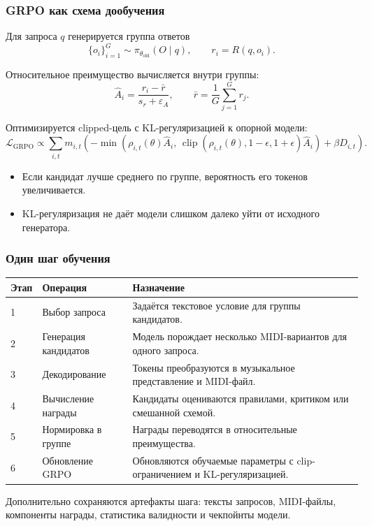 \documentclass[aspectratio=169]{beamer}
\begin{document}
\begin{frame}
\frametitle{GRPO как схема дообучения}
\small
Для запроса $q$ генерируется группа ответов
\[
\{o_i\}_{i=1}^G \sim \pi_{\theta_{\mathrm{old}}}(O \mid q),
\qquad
r_i = R(q, o_i).
\]

Относительное преимущество вычисляется внутри группы:
\[
\hat{A}_i = \frac{r_i - \bar{r}}{s_r + \varepsilon_A},
\qquad
\bar{r} = \frac{1}{G}\sum_{j=1}^G r_j.
\]

Оптимизируется clipped-цель с KL-регуляризацией к опорной модели:
\[
\mathcal{L}_{\mathrm{GRPO}} \propto
\sum_{i,t} m_{i,t}
\left(
-\min(\rho_{i,t}(\theta)\hat{A}_i,\,
\operatorname{clip}(\rho_{i,t}(\theta),1-\epsilon,1+\epsilon)\hat{A}_i)
+ \beta D_{i,t}
\right).
\]

\begin{itemize}
    \item Если кандидат лучше среднего по группе, вероятность его токенов увеличивается.
    \item KL-регуляризация не даёт модели слишком далеко уйти от исходного генератора.
\end{itemize}
\end{frame}

\begin{frame}
\frametitle{Один шаг обучения}
\small
\begin{tabular}{p{} p{} p{}}
\toprule
\textbf{Этап} & \textbf{Операция} & \textbf{Назначение} \\
\midrule
1 & Выбор запроса & Задаётся текстовое условие для группы кандидатов. \\
2 & Генерация кандидатов & Модель порождает несколько MIDI-вариантов для одного запроса. \\
3 & Декодирование & Токены преобразуются в музыкальное представление и MIDI-файл. \\
4 & Вычисление награды & Кандидаты оцениваются правилами, критиком или смешанной схемой. \\
5 & Нормировка в группе & Награды переводятся в относительные преимущества. \\
6 & Обновление GRPO & Обновляются обучаемые параметры с clip-ограничением и KL-регуляризацией. \\
\bottomrule
\end{tabular}

\medskip
Дополнительно сохраняются артефакты шага: тексты запросов, MIDI-файлы, компоненты награды, статистика валидности и чекпойнты модели.
\end{frame}
\end{document}
